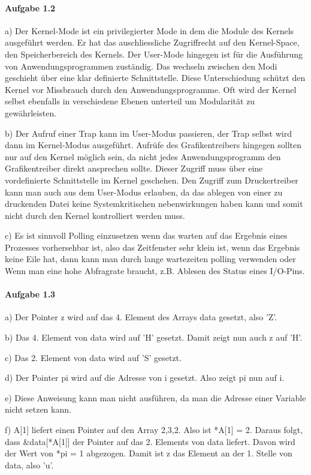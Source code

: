 \documentclass[11pt]{article}
\begin{document}

\paragraph{Aufgabe 1.2}
    a) Der Kernel-Mode ist ein privilegierter Mode in dem die Module des Kernels ausgeführt werden.
    Er hat das auschliessliche Zugriffrecht auf den Kernel-Space, den Speicherbereich des Kernels.
    Der User-Mode hingegen ist für die Ausführung von Anwendungsprogrammen zuständig. Das wechseln zwischen
    den Modi geschieht über eine klar definierte Schnittstelle. Diese Unterschiedung schützt den Kernel
    vor Missbrauch durch den Anwendungsprogramme. Oft wird der Kernel selbst ebenfalls in verschiedene
    Ebenen unterteil um Modularität zu gewährleisten.

    b) Der Aufruf einer Trap kann im User-Modus passieren, der Trap selbst wird dann im Kernel-Modus ausgeführt.
    Aufrüfe des Grafikentreibers hingegen sollten nur auf den Kernel möglich sein, da nicht jedes Anwendungsprogramm
    den Grafikentreiber direkt ansprechen sollte. Dieser Zugriff muss über eine vordefinierte Schnittstelle im Kernel
    geschehen. Den Zugriff zum Druckertreiber kann man auch aus dem User-Modus erlauben, da das ablegen von einer
    zu druckenden Datei keine Systemkritischen nebenwirkungen haben kann und somit nicht durch den Kernel kontrolliert
    werden muss.

    c) Es ist sinnvoll Polling einzusetzen wenn das warten auf das Ergebnis eines Prozesses vorhersehbar ist, also das
    Zeitfenster sehr klein ist, wenn das Ergebnis keine Eile hat, dann kann man durch lange wartezeiten polling verwenden oder
    Wenn man eine hohe Abfragrate braucht, z.B. Ablesen des Status eines I/O-Pins.

\paragraph{Aufgabe 1.3}
    a) Der Pointer z wird auf das 4. Element des Arrays data gesetzt, also 'Z'.

    b) Das 4. Element von data wird auf 'H' gesetzt. Damit zeigt nun auch z auf 'H'.

    c) Das 2. Element von data wird auf 'S' gesetzt.

    d) Der Pointer pi wird auf die Adresse von i gesetzt. Also zeigt pi nun auf i.

    e) Diese Anweisung kann man nicht ausführen, da man die Adresse einer Variable nicht setzen kann.

    f) A[1] liefert einen Pointer auf den Array {2,3,2}. Also ist *A[1] = 2. Daraus folgt, dass &data[*A[1]] der Pointer auf
    das 2. Elements von data liefert. Davon wird der Wert von *pi = 1 abgezogen. Damit ist z das Element an der 1. Stelle von data, also 'u'.
\end{document}

